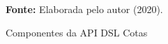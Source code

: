 \begin{figure}[ht!]
\centering

\caption{\textmd{Componentes da API DSL Cotas}}
\label{fig:apicomponentes}

\par\medskip\textbf{Fonte:} Elaborada pelo autor (2020). \par\medskip

\end{figure}

